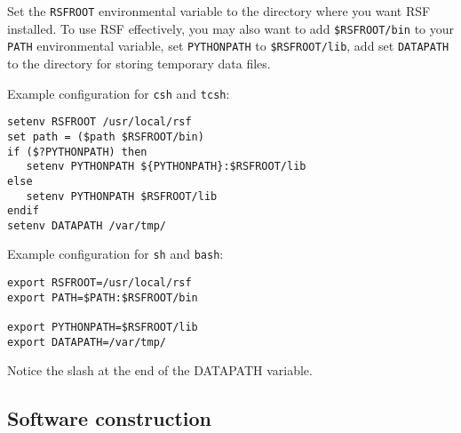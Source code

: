 Set the \texttt{RSFROOT} environmental variable to the directory where
you want RSF installed. To use RSF effectively, you may also want to add
\texttt{\$RSFROOT/bin} to your \texttt{PATH} environmental variable, set
\texttt{PYTHONPATH} to \texttt{\$RSFROOT/lib}, add set \texttt{DATAPATH} to
the directory for storing temporary data files. 

Example configuration for \texttt{csh} and \texttt{tcsh}:
\begin{verbatim}
setenv RSFROOT /usr/local/rsf
set path = ($path $RSFROOT/bin)
if ($?PYTHONPATH) then
   setenv PYTHONPATH ${PYTHONPATH}:$RSFROOT/lib
else
   setenv PYTHONPATH $RSFROOT/lib
endif
setenv DATAPATH /var/tmp/
\end{verbatim}

Example configuration for \texttt{sh} and \texttt{bash}:
\begin{verbatim}
export RSFROOT=/usr/local/rsf
export PATH=$PATH:$RSFROOT/bin

export PYTHONPATH=$RSFROOT/lib
export DATAPATH=/var/tmp/
\end{verbatim}

Notice the slash at the end of the DATAPATH variable.

\subsection{Software construction}

